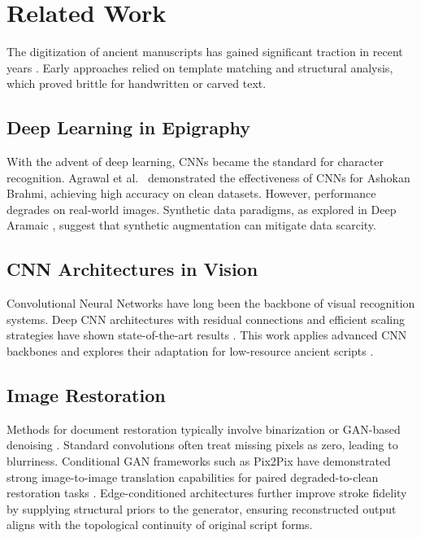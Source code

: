 \documentclass[conference]{IEEEtran}
\begin{document}
\section{Related Work}

The digitization of ancient manuscripts has gained significant traction in recent years \cite{ymer2024comparative}. Early approaches relied on template matching and structural analysis, which proved brittle for handwritten or carved text.

\subsection{Deep Learning in Epigraphy}

With the advent of deep learning, CNNs became the standard for character recognition. Agrawal et al.\ \cite{agrawal2024brahmiocr} demonstrated the effectiveness of CNNs for Ashokan Brahmi, achieving high accuracy on clean datasets. However, performance degrades on real-world images. Synthetic data paradigms, as explored in Deep Aramaic \cite{vahdat2023deeparamaic}, suggest that synthetic augmentation can mitigate data scarcity.

\subsection{CNN Architectures in Vision}

Convolutional Neural Networks have long been the backbone of visual recognition systems. Deep CNN architectures with residual connections and efficient scaling strategies have shown state-of-the-art results \cite{ramesh2025integrating}. This work applies advanced CNN backbones and explores their adaptation for low-resource ancient scripts \cite{dehghan2024lowresource}.

\subsection{Image Restoration}

Methods for document restoration typically involve binarization or GAN-based denoising \cite{mandal2020restoration}. Standard convolutions often treat missing pixels as zero, leading to blurriness. Conditional GAN frameworks such as Pix2Pix have demonstrated strong image-to-image translation capabilities for paired degraded-to-clean restoration tasks \cite{wu2021denoising}. Edge-conditioned architectures further improve stroke fidelity by supplying structural priors to the generator, ensuring reconstructed output aligns with the topological continuity of original script forms.
\end{document}
